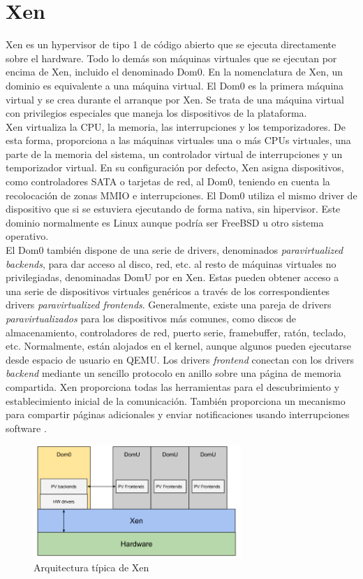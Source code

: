 \section{Xen}
Xen \cite{xen_arm_whitepaper} es un hypervisor de tipo 1 de código abierto que se ejecuta directamente sobre el hardware. Todo lo demás son máquinas virtuales que se ejecutan por encima de Xen, incluido el denominado Dom0. En la nomenclatura de Xen, un dominio es equivalente a una máquina virtual. El Dom0 es la primera máquina virtual y se crea durante el arranque por Xen. Se trata de una máquina virtual con privilegios especiales que maneja los dispositivos de la plataforma.\\
Xen virtualiza la CPU, la memoria, las interrupciones y los temporizadores. De esta forma, proporciona a las máquinas virtuales una o más CPUs virtuales, una parte de la memoria del sistema, un controlador virtual de interrupciones y un temporizador virtual. En su configuración por defecto, Xen asigna dispositivos, como controladores SATA o tarjetas de red, al Dom0, teniendo en cuenta la recolocación de zonas MMIO e interrupciones. El Dom0 utiliza el mismo driver de dispositivo que si se estuviera ejecutando de forma nativa, sin hipervisor. Este dominio normalmente es Linux aunque podría ser FreeBSD u otro sistema operativo.\\
El Dom0 también dispone de una serie de drivers, denominados \textit{paravirtualized backends}, para dar acceso al disco, red, etc. al resto de máquinas virtuales no privilegiadas, denominadas DomU por en Xen. Estas pueden obtener acceso a una serie de dispositivos virtuales genéricos a través de los correspondientes drivers \textit{paravirtualized frontends}. Generalmente, existe una pareja de drivers \textit{paravirtualizados} para los dispositivos más comunes, como discos de almacenamiento, controladores de red, puerto serie, framebuffer, ratón, teclado, etc. Normalmente, están alojados en el kernel, aunque algunos pueden ejecutarse desde espacio de usuario en QEMU. Los drivers \textit{frontend} conectan con los drivers \textit{backend} mediante un sencillo protocolo en anillo sobre una página de memoria compartida. Xen proporciona todas las herramientas para el descubrimiento y establecimiento inicial de la comunicación. También proporciona un mecanismo para compartir páginas adicionales y enviar notificaciones usando interrupciones software \cite{xen_arm_whitepaper}.\\

\begin{figure}[!htb]
  \centering
  \includegraphics[width=0.70\textwidth]{recursos/xen_1.png}
  \caption{Arquitectura típica de Xen}
  \label{fig:xen_1}
\end{figure}

